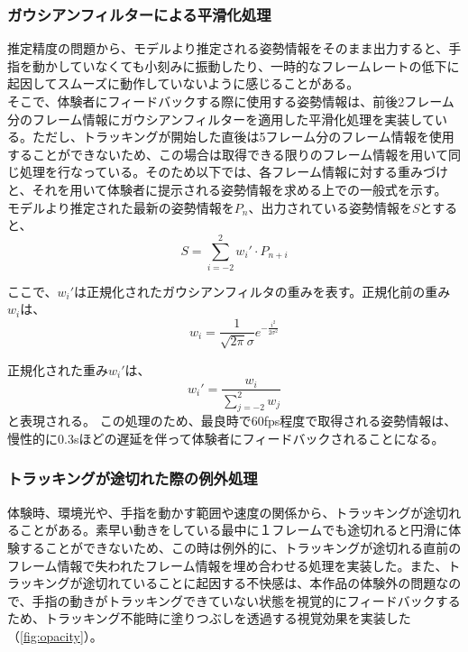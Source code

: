 \subsubsection*{ガウシアンフィルターによる平滑化処理}
推定精度の問題から、モデルより推定される姿勢情報をそのまま出力すると、手指を動かしていなくても小刻みに振動したり、一時的なフレームレートの低下に起因してスムーズに動作していないように感じることがある。\\
そこで、体験者にフィードバックする際に使用する姿勢情報は、前後2フレーム分のフレーム情報にガウシアンフィルターを適用した平滑化処理を実装している。ただし、トラッキングが開始した直後は5フレーム分のフレーム情報を使用することができないため、この場合は取得できる限りのフレーム情報を用いて同じ処理を行なっている。そのため以下では、各フレーム情報に対する重みづけと、それを用いて体験者に提示される姿勢情報を求める上での一般式を示す。
モデルより推定された最新の姿勢情報を\(P_{n}\)、出力されている姿勢情報を\(S\)とすると、
  \begin{equation}
    S = \sum_{i=-2}^{2} w_i' \cdot P_{n+i}
    \end{equation}

ここで、\(w_i'\)は正規化されたガウシアンフィルタの重みを表す。正規化前の重み\(w_i\)は、
\begin{equation}
  w_i = \frac{1}{\sqrt{2\pi}\sigma} e^{-\frac{i^2}{2\sigma^2}}
  \end{equation}

正規化された重み\(w_i'\)は、
  \begin{equation}
  w_i' = \frac{w_i}{\sum_{j=-2}^{2} w_j}
  \end{equation}
と表現される。
この処理のため、最良時で60fps程度で取得される姿勢情報は、慢性的に0.3sほどの遅延を伴って体験者にフィードバックされることになる。

\subsubsection*{トラッキングが途切れた際の例外処理}
体験時、環境光や、手指を動かす範囲や速度の関係から、トラッキングが途切れることがある。素早い動きをしている最中に１フレームでも途切れると円滑に体験することができないため、この時は例外的に、トラッキングが途切れる直前のフレーム情報で失われたフレーム情報を埋め合わせる処理を実装した。また、トラッキングが途切れていることに起因する不快感は、本作品の体験外の問題なので、手指の動きがトラッキングできていない状態を視覚的にフィードバックするため、トラッキング不能時に塗りつぶしを透過する視覚効果を実装した（\ref{fig:opacity}）。

